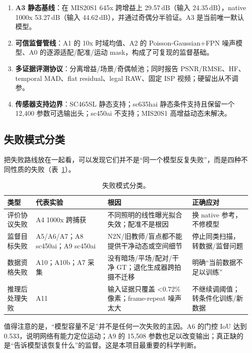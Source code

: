 \documentclass[11pt,a4paper,UTF8,fontset=fandol]{ctexart}
\newcommand{\db}{\ensuremath{\,\mathrm{dB}}}
\begin{document}
\begin{enumerate}
  \item \textbf{A3 静态基线}：在 MIS20S1 645x 跨增益上 29.57\db（输入 24.35\db），native 1000x 53.27\db（输入 44.62\db），并通过奇偶分半验证。A3 是当前唯一默认模型。
  \item \textbf{可信监督管线}：A1 的 10x 时域均值、A2 的 Poisson-Gaussian+FPN 噪声模型、A0 的逐源适配/配准/运动 mask，构成了可复现的监督基础。
  \item \textbf{多证据评测协议}：分离增益/场景/奇偶帧池；同时报告 PSNR/RMSE、HF、temporal MAD、flat residual、legal RAW、固定 ISP 视频；硬留出从不调参。
  \item \textbf{传感器支持边界}：SC465SL 静态支持；sc635hai 静态条件支持且保留一个 12,400 参数可选输出头；sc450ai 不支持；MIS20S1 高增益动态未解决。
\end{enumerate}

\subsection{失败模式分类}

把失败路线放在一起看，可以发现它们并不是“同一个模型反复失败”，而是四种不同性质的失败（表~\ref{tab:failure}）。

\begin{table}[H]
\centering
\small
\caption{失败模式分类。}
\label{tab:failure}
\begin{tabular}{p{}p{}p{}p{}}
\toprule
类型 & 代表实验 & 根因 & 正确应对 \\
\midrule
评价协议失败 & A4 1000x 跨捕获 & 不同照明的线性曝光拟合失效；配准不是根因 & 换 native 参考，不修模型 \\
监督目标失败 & A5/A6/A7；A8 sc450ai；A9 sc450ai & N2N/旧教师/盲点都不能提供干净动态或空间细节 & 停止同类扫描，转数据/监督问题 \\
数据资格失败 & A10；A10b；A7 采集 & 没有暗场/平场/配对/干净 GT；退化生成器跨拍摄不迁移 & 明确“当前数据不足以训练” \\
推理后处理失败 & A11 & 输入证据只覆盖 <0.72\% 像素；frame-repeat 噪声太大 & 不继续调阈值；转条件化训练/新数据 \\
\bottomrule
\end{tabular}
\end{table}

值得注意的是，“模型容量不足”并不是任何一次失败的主因。A6 的门控 IoU 达到 0.533，说明网络有能力定位运动；A9 的 15,508 参数也足以改变输出；真正缺的是“告诉模型该恢复什么”的监督。这是本项目最重要的科学判断。
\end{document}
